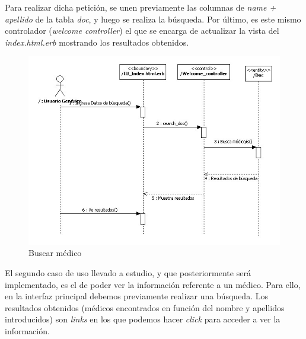 				Para realizar dicha petición, se unen previamente las columnas de \textit{name + apellido} de la tabla \textit{doc}, y luego se realiza la búsqueda. Por último, es este mismo controlador  (\textit{welcome controller}) el que se encarga de actualizar la vista del \textit{index.html.erb} mostrando los resultados obtenidos.

				\bigskip
				\bigskip

				\begin{figure}[H]
				  \centering
				    \includegraphics[width=16cm]{img/jpg/secuencia/01_BuscarMedico.jpg}
				  \caption{Buscar médico}
				  \label{fig:sec_general_buscarmedico}
				\end{figure}
				\newpage
				El segundo caso de uso llevado a estudio, y que posteriormente será implementado, es el de poder ver la información referente a un médico. Para ello, en la interfaz principal debemos previamente realizar una búsqueda. Los resultados obtenidos (médicos encontrados en función del nombre y apellidos introducidos) son \textit{links} en los que podemos hacer \textit{click} para acceder a ver la información.

